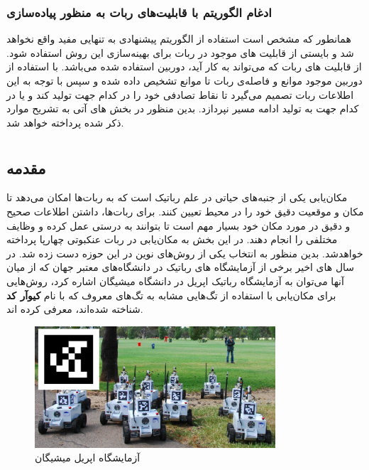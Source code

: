 \subsubsection{ادغام الگوریتم با قابلیت‌های ربات به منظور پیاده‌سازی}
همانطور که مشخص است استفاده از الگوریتم پیشنهادی به تنهایی مفید واقع نخواهد شد و بایستی از قابلیت های موجود در ربات برای بهینه‌سازی این روش استفاده شود. از قابلیت های ربات که می‌تواند به کار آید، دوربین استفاده شده می‌باشد. با استفاده از دوربین موجود موانع و فاصله‌ی ربات تا موانع تشخیص داده شده و سپس با توجه به این اطلاعات ربات تصمیم می‌گیرد تا نقاط تصادفی خود را در کدام جهت تولید کند و یا در کدام جهت به تولید ادامه مسیر نپردازد. بدین منظور در بخش های آتی به تشریح موارد ذکر شده پرداخته خواهد شد.

\newpage
\section{}

\subsection{مقدمه}

مکان‌یابی یکی از جنبه‌های حیاتی در علم رباتیک است که به ربات‌ها امکان می‌دهد تا مکان و موقعیت دقیق خود را در محیط تعیین کنند. برای ربات‌ها، داشتن اطلاعات صحیح و دقیق در مورد مکان خود بسیار مهم است تا بتوانند به درستی عمل کرده و وظایف مختلفی را انجام دهند. در این بخش به مکان‌یابی در ربات عنکبوتی چهارپا پرداخته خواهد‌شد. بدین منظور به انتخاب یکی از روش‌‌‌های نوین در این حوزه دست زده شد. در سال های اخیر برخی از آزمایشگاه های رباتیک در دانشگاه‌‌‌های معتبر جهان که از میان آنها می‌توان به آزمایشگاه رباتیک اپریل
\noindent\unskip{}
در دانشگاه میشیگان اشاره کرد، روش‌هایی برای مکان‌یابی با استفاده از تگ‌هایی مشابه به تگ‌های معروف که با نام 
\textbf{کیوآر کد}
\noindent\unskip{}
شناخته شده‌اند، معرفی کرده اند.

\begin{figure}[H]
	\centering
	\includegraphics[width=0.8\textwidth]{./images/Chapter2/AprilTagLab}	
	\caption[آزمایشگاه اپریل میشیگان]{ آزمایشگاه اپریل میشیگان\cite{Apriltag}}
	\label{AprilTagLab}
\end{figure}
\noindent
\unskip

